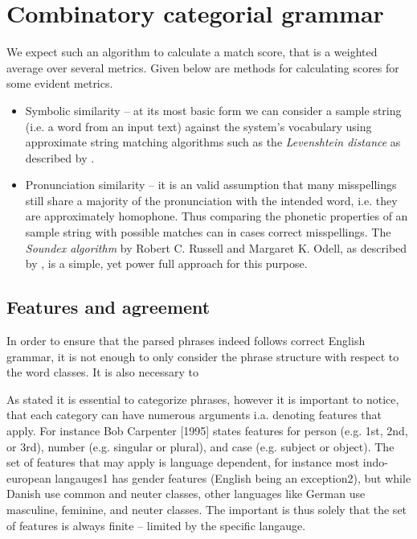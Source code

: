 
\chapter{Combinatory categorial grammar}
\label{chap:CCG}

We expect such an algorithm to calculate a match score, that is a weighted average over several metrics. Given below are methods for calculating scores for some evident metrics.

\begin{itemize}
  \item Symbolic similarity -- at its most basic form we can consider a sample string (i.e. a word from an input text) against the system's vocabulary using approximate string matching algorithms such as the  \emph{Levenshtein distance} as described by \cite{Wagner}.

  \item Pronunciation similarity -- it is an valid assumption that many misspellings still share a majority of the pronunciation with the intended word, i.e. they are approximately homophone. Thus comparing the phonetic properties of an sample string with possible matches can in cases correct misspellings. The \emph{Soundex algorithm} by Robert C. Russell and Margaret K. Odell, as described by \cite[p. 391–92]{ACP3}, is a simple, yet power full approach for this purpose.

\end{itemize}

\section{Features and agreement}
In order to ensure that the parsed phrases indeed follows correct English grammar, it is not enough to only consider the phrase structure with respect to the word classes. It is also necessary to 

As stated it is essential to categorize phrases, however it is important to notice, that each category can have numerous arguments i.a. denoting features that apply. For instance Bob Carpenter [1995] states features for person (e.g. 1st, 2nd, or 3rd), number (e.g. singular or plural), and case (e.g. subject or object). The set of features that may apply is language dependent, for instance most indo-european langauges1 has gender features (English being an exception2), but while Danish use common and neuter classes, other languages like German use masculine, feminine, and neuter classes. The important is thus solely that the set of features is always finite – limited by the specific langauge. 

